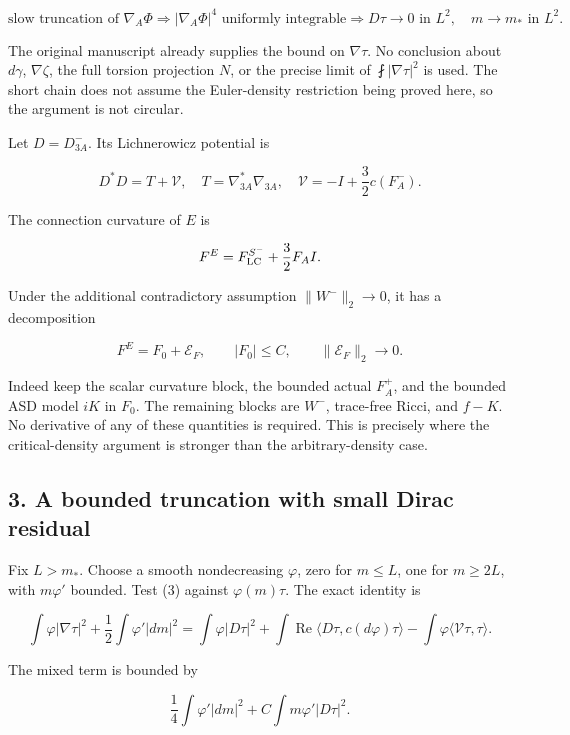 \[
 \text{slow truncation of }\nabla_A\Phi
 \Longrightarrow |\nabla_A\Phi|^4\text{ uniformly integrable}
 \Longrightarrow D\tau\to0\text{ in }L^2,\quad m\to m_*\text{ in }L^2.
\]

The original manuscript already supplies the bound on \(\nabla\tau\). No
conclusion about \(d\gamma\), \(\nabla\zeta\), the full torsion
projection \(N\), or the precise limit of \(\fint|\nabla\tau|^2\) is
used. The short chain does not assume the Euler-density restriction
being proved here, so the argument is not circular.

Let \(D=D^-_{3A}\). Its Lichnerowicz potential is

\[
 D^*D=T+\mathcal V,\quad
 T=\nabla_{3A}^*\nabla_{3A},\quad
 \mathcal V=-I+\frac32c(F_A^-).
\tag{3}
\]

The connection curvature of \(E\) is

\[
 F^E=F^{S^-}_{\rm LC}+\frac32F_A I.
\]

Under the additional contradictory assumption \(\|W^-\|_2\to0\), it has
a decomposition

\[
 F^E=F_0+\mathcal E_F,\qquad |F_0|\le C,
 \qquad\|\mathcal E_F\|_2\to0.\tag{4}
\]

Indeed keep the scalar curvature block, the bounded actual \(F_A^+\),
and the bounded ASD model \(iK\) in \(F_0\). The remaining blocks are
\(W^-\), trace-free Ricci, and \(f-K\). No derivative of any of these
quantities is required. This is precisely where the critical-density
argument is stronger than the arbitrary-density case.

\hypertarget{o10critical:a-bounded-truncation-with-small-dirac-residual}{%
\subsection{3. A bounded truncation with small Dirac
residual}\label{o10critical:a-bounded-truncation-with-small-dirac-residual}}

Fix \(L>m_*\). Choose a smooth nondecreasing \(\varphi\), zero for
\(m\le L\), one for \(m\ge2L\), with \(m\varphi'\) bounded. Test (3)
against \(\varphi(m)\tau\). The exact identity is

\[
 \int\varphi|\nabla\tau|^2+
 \frac12\int\varphi'|dm|^2
 =\int\varphi|D\tau|^2+
 \int\operatorname{Re}\langle D\tau,c(d\varphi)\tau\rangle
 -\int\varphi\langle\mathcal V\tau,\tau\rangle.
\tag{5}
\]

The mixed term is bounded by

\[
 \frac14\int\varphi'|dm|^2+
 C\int m\varphi'|D\tau|^2.
\]

